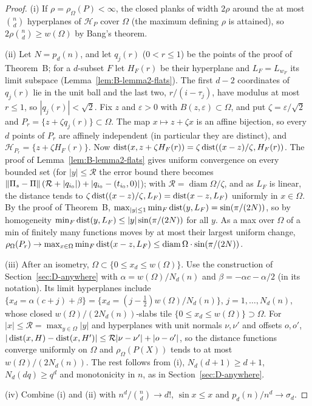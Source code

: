 \documentclass[11pt]{article}
\begin{document}
\begin{proof}
(i) If $\rho=\rho_\Omega(P)<\infty$, the closed planks of width $2\rho$ around the at most $\binom nd$ hyperplanes of
$\mathcal H_P$ cover $\Omega$ (the maximum defining $\rho$ is attained), so $2\rho\binom nd\ge w(\Omega)$ by Bang's theorem.

(ii) Let $N=p_d(n)$, and let $q_j(r)$ ($0<r\le1$) be the points of the proof of Theorem~B; for a $d$-subset $F$
let $H_F(r)$ be their hyperplane and $L_F=L_{w_F}$ its limit subspace (Lemma~\ref{lem:B-lemma2-flats}). The first $d-2$
coordinates of $q_j(r)$ lie in the unit ball and the last two, $r/(i-\tau_j)$, have modulus at most $r\le1$, so
$|q_j(r)|<\sqrt2$. Fix $z$ and $\varepsilon>0$ with $B(z,\varepsilon)\subset\Omega$, and put $\zeta=\varepsilon/\sqrt2$ and
$P_r=\{z+\zeta q_j(r)\}\subset\Omega$. The map $x\mapsto z+\zeta x$ is an affine bijection, so every $d$ points of $P_r$ are
affinely independent (in particular they are distinct), and $\mathcal H_{P_r}=\{z+\zeta H_F(r)\}$. Now
$\operatorname{dist}(x,z+\zeta H_F(r))=\zeta\operatorname{dist}((x-z)/\zeta,H_F(r))$. The proof of Lemma~\ref{lem:B-lemma2-flats} gives uniform
convergence on every bounded set (for $|y|\le\mathcal R$ the error bound there becomes
$\left\|\Pi_s-\Pi\right\|(\mathcal R+|q_{i_0}|)+|q_{i_0}-(t_{i_0},0)|$); with $\mathcal R=\operatorname{diam}\Omega/\zeta$, and as $L_F$ is linear, the
distance tends to $\zeta\operatorname{dist}((x-z)/\zeta,L_F)=\operatorname{dist}(x-z,L_F)$ uniformly in $x\in\Omega$. By the proof of Theorem~B,
$\max_{|y|\le1}\min_F\operatorname{dist}(y,L_F)=\sin(\pi/(2N))$, so by homogeneity $\min_F\operatorname{dist}(y,L_F)\le|y|\sin(\pi/(2N))$ for all
$y$. As a max over $\Omega$ of a min of finitely many functions moves by at most their largest uniform change,
$\rho_\Omega(P_r)\to\max_{x\in\Omega}\min_F\operatorname{dist}(x-z,L_F)\le\operatorname{diam}\Omega\cdot\sin(\pi/(2N))$.

(iii) After an isometry, $\Omega\subset\{0\le x_d\le w(\Omega)\}$. Use the construction of Section~\ref{sec:D-anywhere} with
$\alpha=w(\Omega)/N_d(n)$ and $\beta=-\alpha c-\alpha/2$ (in its notation). Its limit hyperplanes include
$\{x_d=\alpha(c+j)+\beta\}=\{x_d=(j-\frac12)w(\Omega)/N_d(n)\}$, $j=1,\dots,N_d(n)$, whose closed $w(\Omega)/(2N_d(n))$-slabs
tile $\{0\le x_d\le w(\Omega)\}\supset\Omega$. For $|x|\le\mathcal R=\max_{y\in\Omega}|y|$ and hyperplanes with unit normals
$\nu,\nu'$ and offsets $o,o'$, $|\operatorname{dist}(x,H)-\operatorname{dist}(x,H')|\le\mathcal R|\nu-\nu'|+|o-o'|$, so the distance functions
converge uniformly on $\Omega$ and $\rho_\Omega(P(X))$ tends to at most $w(\Omega)/(2N_d(n))$. The rest follows from (i),
$N_d(d+1)\ge d+1$, $N_d(dq)\ge q^d$ and monotonicity in $n$, as in Section~\ref{sec:D-anywhere}.

(iv) Combine (i) and (ii) with $n^d/\binom nd\to d!$, $\sin x\le x$ and $p_d(n)/n^d\to\sigma_d$.
\end{proof}
\end{document}
